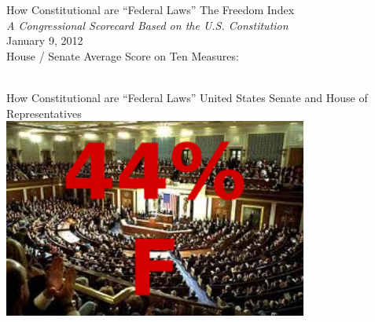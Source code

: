 \documentclass{beamer}
\begin{document}
\begin{frame}{How Constitutional are ``Federal Laws''}
    \centering
    { \Huge{The Freedom Index} } \\
    \vspace{10pt}
    \emph{A Congressional Scorecard Based on the U.S. Constitution} \\
    \pause
    January 9, 2012 \\
    \vspace{15pt}
    House / Senate Average Score on Ten Measures: \\
    \vspace{20pt}
    \pause
     \\
\end{frame}

\begin{frame}{How Constitutional are ``Federal Laws''}
    \centering
    { \Large{United States Senate and House of Representatives }} \\
    \vspace{20pt}
    \includegraphics[width=0.75\textwidth]{img/house-senate-fail.png} \\
\end{frame}
\end{document}
